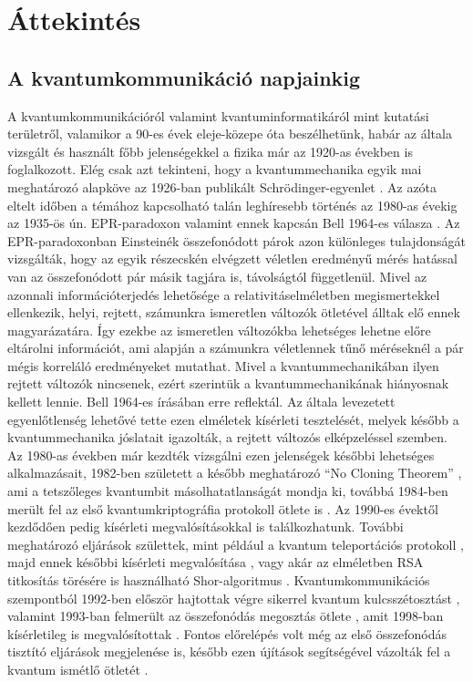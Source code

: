 \chapter{Áttekintés}

\section{A kvantumkommunikáció napjainkig}

A kvantumkommunikációról valamint kvantuminformatikáról mint kutatási területről, valamikor a 90-es évek eleje-közepe óta beszélhetünk, habár az általa vizsgált és használt főbb jelenségekkel a fizika már az 1920-as években is foglalkozott. Elég csak azt tekinteni, hogy a kvantummechanika egyik mai meghatározó alapköve az 1926-ban publikált Schrödinger-egyenlet \cite{schrodinger1926undulatory}. Az azóta eltelt időben a témához kapcsolható talán leghíresebb történés az 1980-as évekig az 1935-ös ún. EPR-paradoxon \cite{einstein1935can} valamint ennek kapcsán Bell 1964-es válasza \cite{bellt1964einstein}. Az EPR-paradoxonban Einsteinék összefonódott párok azon különleges tulajdonságát vizsgálták, hogy az egyik részecskén elvégzett véletlen eredményű mérés hatással van az összefonódott pár másik tagjára is, távolságtól függetlenül.  Mivel az azonnali információterjedés lehetősége a relativitáselméletben megismertekkel ellenkezik, helyi, rejtett, számunkra ismeretlen változók ötletével álltak elő ennek magyarázatára. Így ezekbe az ismeretlen változókba lehetséges lehetne előre eltárolni információt, ami alapján a számunkra véletlennek tűnő méréseknél a pár mégis korreláló eredményeket mutathat. Mivel a kvantummechanikában ilyen rejtett változók nincsenek, ezért szerintük a kvantummechanikának hiányosnak kellett lennie. Bell 1964-es írásában erre reflektál. Az általa levezetett egyenlőtlenség lehetővé tette ezen elméletek kísérleti tesztelését, melyek később a kvantummechanika jóslatait igazolták, a rejtett változós elképzeléssel szemben.\\
 Az 1980-as években már kezdték vizsgálni ezen jelenségek későbbi lehetséges alkalmazásait, 1982-ben született a később meghatározó ``No Cloning Theorem'' \cite{wootters1982single}, ami a tetszőleges kvantumbit másolhatatlanságát mondja ki, továbbá 1984-ben merült fel az első kvantumkriptográfia protokoll ötlete is \cite{BB84}. Az 1990-es évektől kezdődően pedig kísérleti megvalósításokkal is találkozhatunk. További meghatározó eljárások születtek, mint például a kvantum teleportációs protokoll \cite{bennett1993teleporting}, majd ennek későbbi kísérleti megvalósítása \cite{bouwmeester1997experimental}, vagy akár az elméletben RSA titkosítás törésére is használható Shor-algoritmus \cite{shor1999polynomial}. Kvantumkommunikációs szempontból 1992-ben először hajtottak végre sikerrel kvantum kulcsszétosztást \cite{bennett1992experimental}, valamint 1993-ban felmerült az összefonódás megosztás ötlete \cite{zukowski1993event}, amit 1998-ban kísérletileg is megvalósítottak \cite{pan1998experimental}. Fontos előrelépés volt még az első összefonódás tisztító eljárások \cite{bennett1996purification}\cite{deutsch1996quantum} megjelenése is, később ezen újítások segítségével vázolták fel a kvantum ismétlő ötletét \cite{briegel1998quantum}. \\
